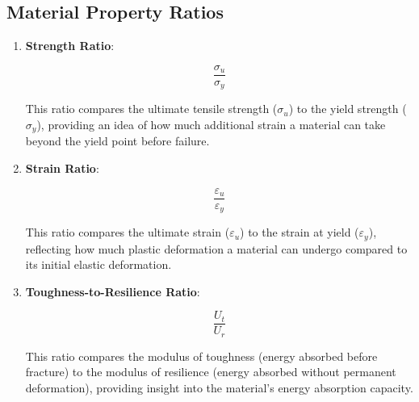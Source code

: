 \documentclass{article}
\begin{document}
\subsection{Material Property Ratios}\label{mpr}
\vspace{0.5em}
\begin{enumerate}
    
    \item \textbf{Strength Ratio}:\\[8pt]
    \begin{minipage}{0.3\textwidth}
        \begin{equation}
            \frac{\sigma_u}{\sigma_y}
        \end{equation}
    \end{minipage}\hfill
    \begin{minipage}{0.6\textwidth}
        This ratio compares the ultimate tensile strength (\(\sigma_u\)) to the yield strength (\(\sigma_y\)), providing an idea of how much additional strain a material can take beyond the yield point before failure.
    \end{minipage}
    
    \item \textbf{Strain Ratio}:\\[8pt]
    \begin{minipage}{0.3\textwidth}
        \begin{equation}
            \frac{\varepsilon_u}{\varepsilon_y}
        \end{equation}
    \end{minipage}\hfill
    \begin{minipage}{0.6\textwidth}
        This ratio compares the ultimate strain (\(\varepsilon_u\)) to the strain at yield (\(\varepsilon_y\)), reflecting how much plastic deformation a material can undergo compared to its initial elastic deformation.
    \end{minipage}
    
    \item \textbf{Toughness-to-Resilience Ratio}:\\[8pt]
    \begin{minipage}{0.3\textwidth}
        \begin{equation}
            \frac{U_t}{U_r}
        \end{equation}
    \end{minipage}\hfill
    \begin{minipage}{0.6\textwidth}
        This ratio compares the modulus of toughness (energy absorbed before fracture) to the modulus of resilience (energy absorbed without permanent deformation), providing insight into the material's energy absorption capacity.
    \end{minipage}
    

\end{enumerate}
\end{document}
